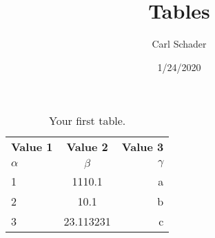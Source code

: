 \documentclass{article}
\title{Tables}
\date{1/24/2020}
\author{Carl Schader}
\begin{document}
	\maketitle

	\begin{table}[h!]
  		\begin{center}
		    \caption{Your first table.}
			\label{tab:table1}
			\begin{tabular}{l|c|r} %
				\textbf{Value 1} & \textbf{Value 2} & \textbf{Value 3}\\
				$\alpha$ & $\beta$ & $\gamma$ \\
				\hline
				1 & 1110.1 & a\\
				2 & 10.1 & b\\
				3 & 23.113231 & c\\
		    \end{tabular}
		\end{center}
	\end{table}
\end{document}
